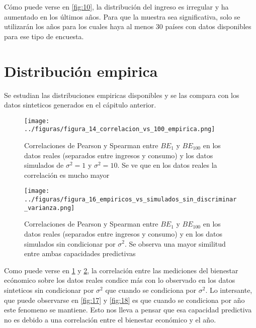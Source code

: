Cómo puede verse en \ref{fig:10}, la distribución del ingreso es irregular y ha aumentado en los últimos años. Para que la muestra sea significativa, solo se utilizarán los años para los cuales haya al menos 30 países con datos disponibles para ese tipo de encuesta.

\section{Distribución empirica}

Se estudian las distribuciones empiricas disponibles y se las compara con los datos sinteticos generados en el cápitulo anterior.

\begin{figure}[H] %
    \centering %
    \texttt{[image: ../figuras/figura\_14\_correlacion\_vs\_100\_empirica.png]} %
    \caption{Correlaciones de Pearson y Spearman entre $BE_1$ y $BE_{100}$ en los datos reales (separados entre ingresos y consumo) y los datos simulados de $\sigma^2=1$ y $\sigma^2=10$. Se ve que en los datos reales la correlación es mucho mayor}
    \label{fig:14} %
\end{figure}

\begin{figure}[H] %
    \centering %
    \texttt{[image: ../figuras/figura\_16\_empiricos\_vs\_simulados\_sin\_discriminar\_varianza.png]} %
    \caption{Correlaciones de Pearson y Spearman entre $BE_1$ y $BE_{100}$ en los datos reales (separados entre ingresos y consumo) y en los datos simulados sin condicionar por $\sigma^2$. Se observa una mayor similitud entre ambas capacidades predictivas}
    \label{fig:16} %
\end{figure}

Como puede verse en \ref{fig:14} y \ref{fig:16}, la correlación entre las mediciones del bienestar ecónomico sobre los datos reales condice más con lo observado en los datos sinteticos sin condicionar por $\sigma^2$ que cuando se condiciona por $\sigma^2$. Lo intersante, que puede observarse en \ref{fig:17} y \ref{fig:18} es que cuando se condiciona por año este fenomeno se mantiene. Esto nos lleva a pensar que esa capacidad predictiva no es debido a una correlación entre el bienestar económico y el año.

